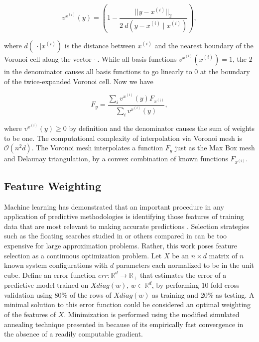 \documentclass[letterpaper, 10 pt, conference]{ieeeconf}  %
\begin{document}
$$ v^{x^{(i)}}(y) = \left(1 - \frac{||y - x^{(i)}||_2}{2 \ d(y - x^{(i)} \mid x^{(i)})} \right), $$

where $d(\ \cdot \mid x^{(i)})$ is the distance between $x^{(i)}$ and the nearest boundary of the Voronoi cell along the vector $\cdot\ $. While all basis functions $v^{x^{(i)}}(x^{(i)}) = 1$, the $2$ in the denominator causes all basis functions to go linearly to $0$ at the boundary of the twice-expanded Voronoi cell. Now we have

$$ F_y = \frac{\sum_i v^{x^{(i)}}(y) F_{x^{(i)}}}{\sum_i v^{x^{(i)}}(y)}, $$

where $v^{x^{(i)}}(y) \geq 0$ by definition and the denominator causes the sum of weights to be one. The computational complexity of interpolation via Voronoi mesh is $\mathcal{O}(n^2 d)$. The Voronoi mesh interpolates a function $F_y$ just as the Max Box mesh and Delaunay triangulation, by a convex combination of known functions $F_{x^{(i)}}$.
\subsection{Feature Weighting}
\label{sec:feature_weighting}

Machine learning has demonstrated that an important procedure in any application of predictive methodologies is identifying those features of training data that are most relevant to making accurate predictions \cite{guyon2003introduction}. Selection strategies such as the floating searches studied in \cite{pudil1994floating} or others compared in \cite{ferri1994comparative} can be too expensive for large approximation problems. Rather, this work poses feature selection as a continuous optimization problem. Let $X$ be an $n \times d$ matrix of $n$ known system configurations with $d$ parameters each normalized to be in the unit cube. Define an error function $err: \mathbb{R}^d \rightarrow \mathbb{R}_+$ that estimates the error of a predictive model trained on $X diag(w)$, $w \in \mathbb{R}^d$,  by performing 10-fold cross validation using 80\% of the rows of $X diag(w)$ as training and 20\% as testing. A minimal solution to this error function could be considered an optimal weighting of the features of $X$. Minimization is performed using the modified simulated annealing technique presented in \cite{lux2016convergence} because of its empirically fast convergence in the absence of a readily computable gradient.

\end{document}
